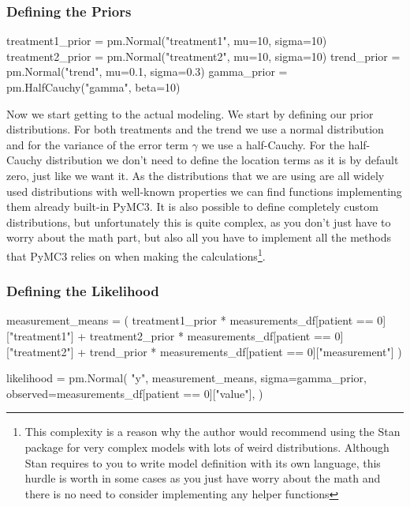\documentclass[12pt,a4paper,leqno]{report}
\theoremstyle{plain}
\theoremstyle{definition}
\theoremstyle{remark}
\begin{document}
\subsubsection{Defining the Priors}

\bigskip
\begin{pyverbatim}
treatment1_prior = pm.Normal("treatment1", mu=10, sigma=10)
treatment2_prior = pm.Normal("treatment2", mu=10, sigma=10)
trend_prior = pm.Normal("trend", mu=0.1, sigma=0.3)
gamma_prior = pm.HalfCauchy("gamma", beta=10)
\end{pyverbatim}
\bigskip

Now we start getting to the actual modeling. We start by defining our prior
distributions. For both treatments and the trend we use a normal distribution and
for the variance of the error term \(\gamma \) we use a half-Cauchy. For the half-Cauchy
distribution we don't need to define the location terms as it is by default zero, just
like we want it. As the distributions that we are using are all
widely used distributions with well-known properties we can find functions implementing
them already built-in PyMC3. It is also possible to define completely custom
distributions, but unfortunately this is quite complex, as you don't just have to worry
about the math part, but also all you have to implement all the methods that PyMC3
relies on when making the calculations\footnote{This complexity is a reason why the author would recommend using the Stan package for very complex models with lots of weird
distributions. Although Stan requires to you to write model definition with its own
language, this hurdle is worth in some cases as you just have
worry about the math and there is no need to consider implementing any helper functions}.

\subsubsection{Defining the Likelihood}

\bigskip
\begin{pyverbatim}
measurement_means = (
    treatment1_prior
    * measurements_df[patient == 0]["treatment1"]
    + treatment2_prior
    * measurements_df[patient == 0]["treatment2"]
    + trend_prior
    * measurements_df[patient == 0]["measurement"]
)

likelihood = pm.Normal(
    "y",
    measurement_means,
    sigma=gamma_prior,
    observed=measurements_df[patient == 0]["value"],
)
\end{pyverbatim}
\bigskip
\end{document}
